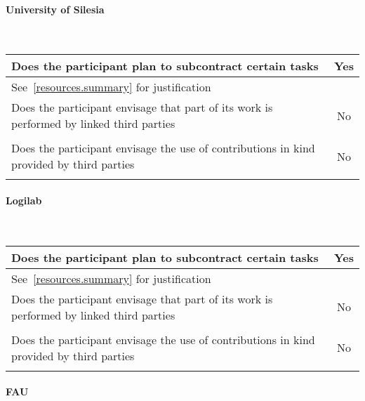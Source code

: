 \bigskip

\paragraph{University of Silesia}\ 

\bgroup
\def\arraystretch{1.5}  %
\noindent \begin{tabular}{|p{}|c|}
\hline
Does the participant plan to subcontract certain
tasks & Yes \\
\hline
\multicolumn{2}{|l|}{See~\ref{resources.summary} for justification} \\
\hline
Does the participant envisage that part of its work
is performed by linked third parties & No \\
\hline
\multicolumn{2}{|l|}{} \\
\hline
Does the participant envisage the use of
contributions in kind provided by
third parties & No \\
\hline
\multicolumn{2}{|l|}{} \\
\hline
\end{tabular}
\egroup

\paragraph{Logilab}\ 

\bgroup
\def\arraystretch{1.5}  %
\noindent \begin{tabular}{|p{}|c|}
\hline
Does the participant plan to subcontract certain
tasks & Yes \\
\hline
\multicolumn{2}{|l|}{See~\ref{resources.summary} for justification} \\
\hline
Does the participant envisage that part of its work
is performed by linked third parties & No \\
\hline
\multicolumn{2}{|l|}{} \\
\hline
Does the participant envisage the use of
contributions in kind provided by
third parties & No \\
\hline
\multicolumn{2}{|l|}{} \\
\hline
\end{tabular}
\egroup

\paragraph{FAU}\ 

